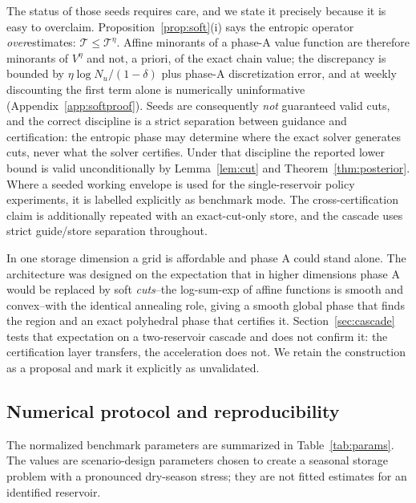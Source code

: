 \documentclass[pdflatex,sn-mathphys-num]{sn-jnl}
\theoremstyle{thmstyleone}
\theoremstyle{thmstyletwo}
\theoremstyle{thmstylethree}
\begin{document}
The status of those seeds requires care, and we state it precisely because
it is easy to overclaim. Proposition~\ref{prop:soft}(i) says the entropic
operator \emph{over}estimates: $\mathcal T\le\mathcal T^\eta$. Affine
minorants of a phase-A value function are therefore minorants of $V^\eta$
and not, a priori, of the exact chain value; the discrepancy is bounded by
$\eta\log N_u/(1-\delta)$ plus phase-A discretization error, and at weekly
discounting the first term alone is numerically uninformative
(Appendix~\ref{app:softproof}). Seeds are consequently \emph{not}
guaranteed valid cuts, and the correct discipline is a strict separation
between guidance and certification: the entropic phase may determine where
the exact solver generates cuts, never what the solver certifies. Under
that discipline the reported lower bound is valid unconditionally by
Lemma~\ref{lem:cut} and Theorem~\ref{thm:posterior}. Where a seeded working envelope is used for the single-reservoir policy
experiments, it is labelled explicitly as benchmark mode. The cross-certification
claim is additionally repeated with an exact-cut-only store, and the cascade
uses strict guide/store separation throughout.

In one storage dimension a grid is affordable and phase A could stand
alone. The architecture was designed on the expectation that in higher
dimensions phase A would be replaced by soft \emph{cuts}--the log-sum-exp
of affine functions is smooth and convex--with the identical annealing
role, giving a smooth global phase that finds the region and an exact
polyhedral phase that certifies it. Section~\ref{sec:cascade} tests that
expectation on a two-reservoir cascade and does not confirm it: the
certification layer transfers, the acceleration does not. We retain the
construction as a proposal and mark it explicitly as unvalidated.


\subsection{Numerical protocol and reproducibility}
\label{sec:protocol}

The normalized benchmark parameters are summarized in Table~\ref{tab:params}.
The values are scenario-design parameters chosen to create a seasonal storage
problem with a pronounced dry-season stress; they are not fitted estimates for
an identified reservoir.
\end{document}
